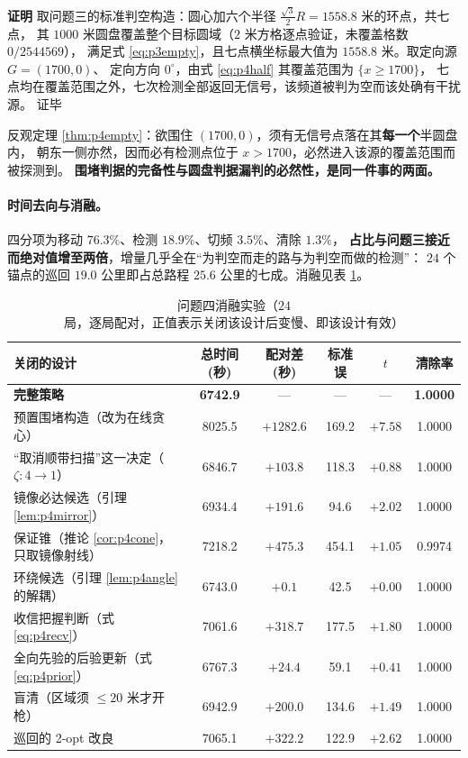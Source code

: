 \documentclass[withoutpreface, bwprint]{cumcmthesis}
\renewenvironment{proof}{\par\noindent\textbf{证明}\quad}{\hfill 证毕\par\medskip}
\begin{document}
\begin{proof}
取问题三的标准判空构造：圆心加六个半径 $\tfrac{\sqrt3}{2}R=1558.8$ 米的环点，共七点，
其 $1000$ 米圆盘覆盖整个目标圆域（$2$ 米方格逐点验证，未覆盖格数 $0/2544569$），
满足式 \eqref{eq:p3empty}，且七点横坐标最大值为 $1558.8$ 米。取定向源 $G=(1700,0)$、
定向方向 $0^\circ$，由式 \eqref{eq:p4half} 其覆盖范围为 $\{x\ge 1700\}$，
七点均在覆盖范围之外，七次检测全部返回无信号，该频道被判为空而该处确有干扰源。
\end{proof}

反观定理 \ref{thm:p4empty}：欲围住 $(1700,0)$，须有无信号点落在其\textbf{每一个}半圆盘内，
朝东一侧亦然，因而必有检测点位于 $x>1700$，必然进入该源的覆盖范围而被探测到。
\textbf{围堵判据的完备性与圆盘判据漏判的必然性，是同一件事的两面。}

\paragraph{时间去向与消融。}
四分项为移动 $76.3\%$、检测 $18.9\%$、切频 $3.5\%$、清除 $1.3\%$，
\textbf{占比与问题三接近而绝对值增至两倍}，增量几乎全在“为判空而走的路与为判空而做的检测”：
$24$ 个锚点的巡回 $19.0$ 公里即占总路程 $25.6$ 公里的七成。消融见表 \ref{tab:p4ablation}。

\begin{table}[H]
  \centering
  \caption{问题四消融实验（$24$ 局，逐局配对，正值表示关闭该设计后变慢、即该设计有效）}
  \label{tab:p4ablation}
  \footnotesize
  \begin{tabularx}{\textwidth}{Xccccc}
    \toprule
    关闭的设计 & 总时间(秒) & 配对差(秒) & 标准误 & $t$ & 清除率 \\
    \midrule
    \textbf{完整策略} & \textbf{6742.9} & --- & --- & --- & \textbf{1.0000} \\
    预置围堵构造（改为在线贪心） & 8025.5 & $+1282.6$ & 169.2 & $+7.58$ & 1.0000 \\
    “取消顺带扫描”这一决定（$\zeta:4\to 1$） & 6846.7 & $+103.8$ & 118.3 & $+0.88$ & 1.0000 \\
    镜像必达候选（引理 \ref{lem:p4mirror}） & 6934.4 & $+191.6$ & 94.6 & $+2.02$ & 1.0000 \\
    保证锥（推论 \ref{cor:p4cone}，只取镜像射线） & 7218.2 & $+475.3$ & 454.1 & $+1.05$ & 0.9974 \\
    环绕候选（引理 \ref{lem:p4angle} 的解耦） & 6743.0 & $+0.1$ & 42.5 & $+0.00$ & 1.0000 \\
    收信把握判断（式 \eqref{eq:p4recv}） & 7061.6 & $+318.7$ & 177.5 & $+1.80$ & 1.0000 \\
    全向先验的后验更新（式 \eqref{eq:p4prior}） & 6767.3 & $+24.4$ & 59.1 & $+0.41$ & 1.0000 \\
    盲清（区域须 $\le 20$ 米才开枪） & 6942.9 & $+200.0$ & 134.6 & $+1.49$ & 1.0000 \\
    巡回的 2-opt 改良 & 7065.1 & $+322.2$ & 122.9 & $+2.62$ & 1.0000 \\
    \bottomrule
  \end{tabularx}
\end{table}
\end{document}
